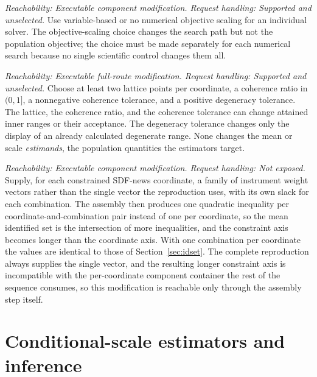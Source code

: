 \documentclass[11pt]{article}
\begin{document}
\begin{description}[style=nextline]
\item[Component objective scaling.]
\emph{Reachability: Executable component modification. Request handling: Supported and unselected.}
Use variable-based or no numerical objective scaling for an individual solver. The objective-scaling choice changes the
search path but not the population objective; the choice must be made separately for each numerical
search because no single scientific control changes them all.

\item[Variance-share lattice and coherence controls.]
\emph{Reachability: Executable full-route modification. Request handling: Supported and unselected.}
Choose at least two lattice points per coordinate, a coherence ratio in \((0,1]\), a nonnegative
coherence tolerance, and a positive degeneracy tolerance. The lattice, the coherence ratio, and the
coherence tolerance can change
attained inner ranges or their acceptance. The degeneracy tolerance changes only the display of an
already calculated degenerate range. None changes the mean or scale \emph{estimands}, the population
quantities the estimators target.

\item[Multiple instrument combinations per coordinate.]
\emph{Reachability: Executable component modification. Request handling: Not exposed.}
Supply, for each constrained SDF-news coordinate, a family of instrument weight vectors rather than
the single vector the reproduction uses, with its own slack for each combination. The assembly then
produces one quadratic inequality per coordinate-and-combination pair instead of one per
coordinate, so the mean identified set is the intersection of more inequalities, and the constraint axis
becomes longer than the coordinate axis. With one combination per coordinate the values are
identical to those of Section~\ref{sec:idset}. The complete reproduction always supplies the single
vector, and the resulting longer constraint axis is incompatible with the per-coordinate component
container the rest of the sequence consumes, so this modification is reachable only through the
assembly step itself.

\end{description}

\section{Conditional-scale estimators and inference}
\end{document}
